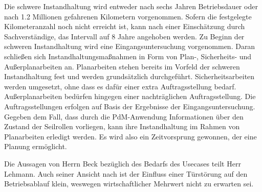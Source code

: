 Die schwere Instandhaltung wird entweder nach sechs Jahren Betriebsdauer oder nach \num{1.2} Millionen gefahrenen Kilometern vorgenommen. Sofern die festgelegte Kilometeranzahl noch nicht erreicht ist, kann nach einer Einschätzung durch Sachverständige, das Intervall	auf \num{8} Jahre angehoben werden. Zu Beginn der schweren Instandhaltung wird eine Eingangsuntersuchung vorgenommen. Daran schließen sich Instandhaltungsmaßnahmen in Form von Plan-, Sicherheits- und Außerplanarbeiten an. Planarbeiten stehen bereits im Vorfeld der schweren Instandhaltung fest und werden grundsätzlich durchgeführt. Sicherheitsarbeiten werden umgesetzt, ohne dass es dafür einer extra Auftragsstellung bedarf. Außerplanarbeiten bedürfen hingegen einer nachträglichen Auftragsstellung. Die Auftragsstellungen erfolgen auf Basis der Ergebnisse der Eingangsuntersuchung. Gegeben dem Fall, dass durch die PdM-Anwendung Informationen über den Zustand der Seilrollen vorliegen, kann ihre Instandhaltung im Rahmen von Planarbeiten erledigt werden. Es wird also ein Zeitvorsprung gewonnen, der eine Planung ermöglicht.

Die Aussagen von Herrn Beck bezüglich des Bedarfs des Usecases teilt Herr Lehmann. Auch seiner Ansicht nach ist der Einfluss einer Türstörung auf den Betriebsablauf klein, weswegen wirtschaftlicher Mehrwert nicht zu erwarten sei.


